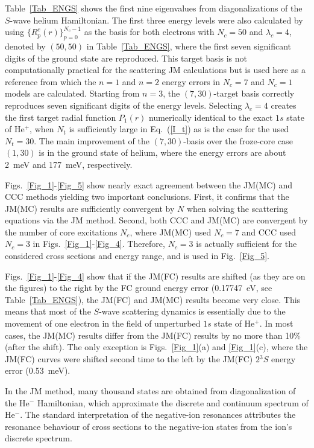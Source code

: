 \documentclass[aip
, pra
, showpacs
, aps
, twocolumn
, groupedaddress
, floatfix
]{revtex4}
\begin{document}
Table~\ref{Tab_ENGS} shows the first nine eigenvalues from diagonalizations of the $S$-wave helium Hamiltonian.
The first three energy levels were also calculated by using
$\{R^{c}_p(r)\}_{p=0}^{N_c-1}$ as the basis for both electrons with $N_c=50$ and $\lambda_c=4$, denoted by $(50,50)$ in Table~\ref{Tab_ENGS},
where the first seven significant digits of the ground state \cite{G94} are reproduced.
This target basis is not computationally practical for the scattering JM calculations but is used here
as a reference from which the $n=1$ and $n=2$ energy errors in $N_c=7$ and $N_c=1$ models are calculated.
Starting from $n=3$, the $(7,30)$-target basis correctly reproduces seven significant digits \cite{DHIF94} of the energy levels.
Selecting $\lambda_c=4$ creates the first target radial function $P_1(r)$ numerically identical to the exact $1s$ state of He$^+$,
when $N_t$ is sufficiently large in Eq.~(\ref{I_t}) as is the case for the used $N_t=30$.
The main improvement of the $(7,30)$-basis over the froze-core case $(1,30)$ is in the ground state of helium,
where the energy errors are about 2~meV and 177~meV, respectively.



Figs.~\ref{Fig_1}-\ref{Fig_5} show nearly exact agreement between the JM(MC) and CCC methods yielding two important conclusions.
First, it confirms that the JM(MC) results are sufficiently convergent by $N$ when solving the scattering equations via the JM method.
Second, both CCC and JM(MC) are convergent by the number of core excitations $N_c$,
where JM(MC) used $N_c=7$ and CCC used $N_c=3$ in Figs.~\ref{Fig_1}-\ref{Fig_4}.
Therefore, $N_c=3$ is actually sufficient for the considered cross sections and energy range, and is used in Fig.~\ref{Fig_5}.


Figs.~\ref{Fig_1}-\ref{Fig_4} show that if the JM(FC) results are shifted (as they are on the figures)
to the right by the FC ground energy error (0.17747~eV, see Table~\ref{Tab_ENGS}),
the JM(FC) and JM(MC) results become very close.
This means that most of the $S$-wave scattering dynamics  is essentially due to
the movement of one electron in the field of unperturbed $1s$ state of He$^+$.
In most cases, the JM(MC) results differ from the JM(FC) results by no more than 10\% (after the shift).
The only exception is Figs.~\ref{Fig_1}(a) and \ref{Fig_1}(c), where the JM(FC) curves were shifted second time to the left by
the JM(FC) $2{^3S}$ energy error (0.53~meV).


In the JM method, many thousand states are obtained from diagonalization of the He$^-$ Hamiltonian,
which approximate the discrete and continuum spectrum of He$^-$.
The standard interpretation of the negative-ion resonances \cite{BC94} attributes the resonance behaviour of cross sections to
the negative-ion states from the ion's discrete spectrum.
\end{document}
